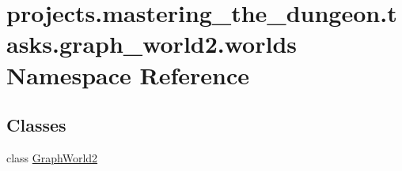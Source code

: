 \hypertarget{namespaceprojects_1_1mastering__the__dungeon_1_1tasks_1_1graph__world2_1_1worlds}{}\section{projects.\+mastering\+\_\+the\+\_\+dungeon.\+tasks.\+graph\+\_\+world2.\+worlds Namespace Reference}
\label{namespaceprojects_1_1mastering__the__dungeon_1_1tasks_1_1graph__world2_1_1worlds}
\subsection*{Classes}
\begin{DoxyCompactItemize}
\item 
class \hyperlink{classprojects_1_1mastering__the__dungeon_1_1tasks_1_1graph__world2_1_1worlds_1_1GraphWorld2}{Graph\+World2}
\end{DoxyCompactItemize}

